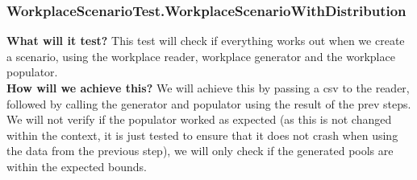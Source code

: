\documentclass{article}
\begin{document}
\subsubsection{WorkplaceScenarioTest.WorkplaceScenarioWithDistribution}
\textbf{What will it test?}
This test will check if everything works out when we create a scenario, using the workplace reader, workplace generator and the workplace populator.\\
\newline
\textbf{How will we achieve this?}
We will achieve this by passing a csv to the reader, followed by calling the generator and populator using the result of the prev steps. We will not verify if the populator worked as expected (as this is not changed within the context, it is just tested to ensure that it does not crash when using the data from the previous step), we will only check if the generated pools are within the expected bounds.
\end{document}
